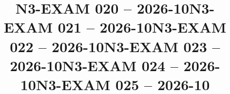 \documentclass{ip-exam}
\begin{document}







\cleartoeven
\setcounter{questioncounter}{0}
\setcounter{page}{1}
\title{N3-EXAM 020 -- 2026-10}
\makeexamheader








\cleartoeven
\setcounter{questioncounter}{0}
\setcounter{page}{1}
\title{N3-EXAM 021 -- 2026-10}
\makeexamheader








\cleartoeven
\setcounter{questioncounter}{0}
\setcounter{page}{1}
\title{N3-EXAM 022 -- 2026-10}
\makeexamheader








\cleartoeven
\setcounter{questioncounter}{0}
\setcounter{page}{1}
\title{N3-EXAM 023 -- 2026-10}
\makeexamheader








\cleartoeven
\setcounter{questioncounter}{0}
\setcounter{page}{1}
\title{N3-EXAM 024 -- 2026-10}
\makeexamheader








\cleartoeven
\setcounter{questioncounter}{0}
\setcounter{page}{1}
\title{N3-EXAM 025 -- 2026-10}
\makeexamheader
\end{document}
